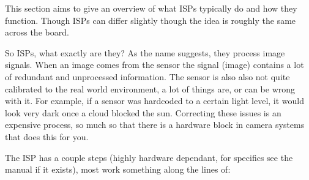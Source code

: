 This section aims to give an overview of what ISPs typically do and how they
function. Though ISPs can differ slightly though the idea is roughly the same
across the board.

So ISPs, what exactly are they? As the name suggests, they process image
signals. When an image comes from the sensor the signal (image) contains a lot
of redundant and unprocessed information. The sensor is also also not quite
calibrated to the real world environment, a lot of things are, or can be wrong
with it. For example, if a sensor was hardcoded to a certain light level, it
would look very dark once a cloud blocked the sun. Correcting these issues is
an expensive process, so much so that there is a hardware block in camera
systems that does this for you.

The ISP has a couple steps (highly hardware dependant, for specifics see the
manual if it exists), most work something along the lines of:

